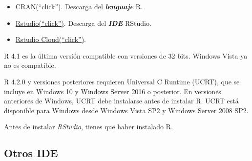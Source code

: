 \documentclass[
  spanish,
  letterpaper,
  DIV=11,
  numbers=noendperiod]{scrreprt}
\begin{document}
\begin{itemize}
\item
  \href{https://cran.r-project.org/}{CRAN(``click'')}. Descarga del
  \textbf{\emph{lenguaje}} R.
\item
  \href{https://www.rstudio.com/products/rstudio/download/}{Rstudio(``click'')}.
  Descarga del \textbf{\emph{IDE}} RStudio.
\item
  \href{https://posit.cloud/plans/free}{Rstudio Cloud(``click'')}.
\end{itemize}

\begin{tcolorbox}[enhanced jigsaw, arc=.35mm, bottomrule=.15mm, bottomtitle=1mm, breakable, colback=white, colbacktitle=quarto-callout-note-color!10!white, colframe=quarto-callout-note-color-frame, coltitle=black, left=2mm, leftrule=.75mm, opacityback=0, opacitybacktitle=0.6, rightrule=.15mm, title=\textcolor{quarto-callout-note-color}{\faInfo}\hspace{0.5em}{Compatibilidad}, titlerule=0mm, toprule=.15mm, toptitle=1mm]

R 4.1 es la última versión compatible con versiones de 32 bits. Windows
Vista ya no es compatible.

R 4.2.0 y versiones posteriores requieren Universal C Runtime (UCRT),
que se incluye en Windows 10 y Windows Server 2016 o posterior. En
versiones anteriores de Windows, UCRT debe instalarse antes de instalar
R. UCRT está disponible para Windows desde Windows Vista SP2 y Windows
Server 2008 SP2.

\end{tcolorbox}

\begin{tcolorbox}[enhanced jigsaw, arc=.35mm, bottomrule=.15mm, bottomtitle=1mm, breakable, colback=white, colbacktitle=quarto-callout-tip-color!10!white, colframe=quarto-callout-tip-color-frame, coltitle=black, left=2mm, leftrule=.75mm, opacityback=0, opacitybacktitle=0.6, rightrule=.15mm, title=\textcolor{quarto-callout-tip-color}{\faLightbulb}\hspace{0.5em}{Importante}, titlerule=0mm, toprule=.15mm, toptitle=1mm]

Antes de instalar \emph{RStudio}, tienes que haber instalado R.

\end{tcolorbox}

\subsection{Otros IDE}\label{otros-ide}
\end{document}
